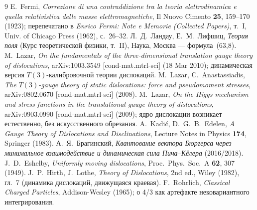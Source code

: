 \documentclass[11pt,a4paper]{article}
\begin{document}
\begin{thebibliography}{9}
 E.~Fermi, \emph{Correzione di una contraddizione tra la
teoria elettrodinamica e quella relativistica delle masse elettromagnetiche},
Il Nuovo Cimento \textbf{25}, 159--170 (1923); перепечатано в
\emph{Enrico Fermi: Note e Memorie (Collected Papers)}, т.~I,
Univ. of Chicago Press (1962), с.~26--32.
 Л.~Д.~Ландау, Е.~М.~Лифшиц, \emph{Теория поля}
(Курс теоретической физики, т.~II), Наука, Москва --- формула~(63,8).
 M.~Lazar, \emph{On the fundamentals of the
three-dimensional translation gauge theory of dislocations},
arXiv:1003.3549 [cond-mat.mtrl-sci] (18 Mar 2010); динамическая версия
$T(3)$-калибровочной теории дислокаций.
 M.~Lazar, C.~Anastassiadis, \emph{The
$T(3)$-gauge theory of static dislocations: force and pseudomoment
stresses}, arXiv:0802.0670 [cond-mat.mtrl-sci] (2008).
 M.~Lazar, \emph{On the Higgs mechanism and stress
functions in the translational gauge theory of dislocations},
arXiv:0903.0990 [cond-mat.mtrl-sci] (2009); ядро дислокации возникает
естественно, без искусственного обрезания.
 A.~Kadi\'c, D.~G.~B.~Edelen, \emph{A Gauge Theory
of Dislocations and Disclinations}, Lecture Notes in Physics \textbf{174},
Springer (1983).
 А.~Я.~Брагинский, \emph{Квантование вектора Бюргерса
через минимальное взаимодействие и динамическая сила Пича--Кёлера}
(2016/2018).
 J.~D.~Eshelby, \emph{Uniformly moving
dislocations}, Proc.~Phys.~Soc.~A \textbf{62}, 307 (1949).
 J.~P.~Hirth, J.~Lothe, \emph{Theory of Dislocations},
2nd ed., Wiley (1982), гл.~7 (динамика дислокаций, движущаяся краевая).
 F.~Rohrlich, \emph{Classical Charged Particles},
Addison-Wesley (1965); о 4/3 как артефакте нековариантного интегрирования.
\end{thebibliography}
\end{document}
